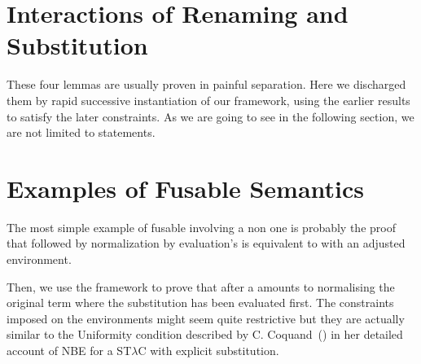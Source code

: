 
\section{Interactions of Renaming and Substitution}



These four lemmas are usually proven in painful separation. Here we discharged
them by rapid successive instantiation of our framework, using the earlier
results to satisfy the later constraints. As we are going to see in the following
section, we are not limited to  statements.

\section{Examples of Fusable Semantics}

The most simple example of fusable  involving a non 
one is probably the proof that  followed by normalization by evaluation's
 is equivalent to  with an adjusted environment.


Then, we use the framework to prove that  after a 
amounts to normalising the original term where the substitution has been
evaluated first. The constraints imposed on the environments might seem
quite restrictive but they are actually similar to the Uniformity condition
described by C. Coquand~(\citeyear{coquand2002formalised}) in her detailed
account of NBE for a ST$λ$C with explicit substitution.
